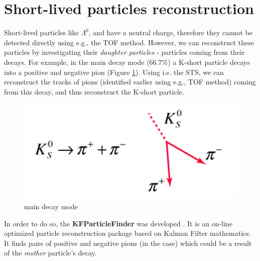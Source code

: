 \section{Short-lived particles reconstruction}

Short-lived particles like $\Lambda^0$, and \PKshort have a neutral charge, therefore they cannot be detected directly using e.g., the TOF method. However, we can reconstruct these particles by investigating their \emph{daughter particles} - particles coming from their decays. For example, in the main decay mode (66.7\%) a K-short particle decays into a positive and negative pion (Figure \ref{ks decay}). Using i.e. the STS, we can reconstruct the tracks of pions (identified earlier using e.g., TOF method) coming from this decay, and thus reconstruct the K-short particle.

\begin{figure}[H]
\centering
    \includegraphics[width=.4\textwidth]{img/kdecay1.png}
    \caption{\PKshort main decay mode \cite{kdecay1}}
    \label{ks decay}
\end{figure}

In order to do so, the \textbf{KFParticleFinder} was developed \cite{kfp}. It is an on-line optimized particle reconstruction package based on Kalman Filter mathematics. It finds pairs of positive and negative pions (in the \PKshort case) which could be a result of the \emph{mother} particle's decay.
